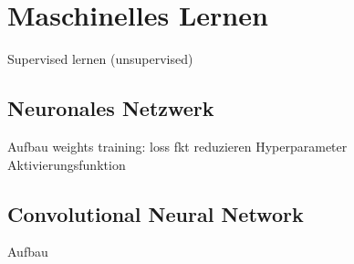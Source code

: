 \section{Maschinelles Lernen}
Supervised lernen (unsupervised)


\subsection{Neuronales Netzwerk}

Aufbau
    weights 
training: loss fkt reduzieren
Hyperparameter
Aktivierungsfunktion 
\subsection{Convolutional Neural Network}

Aufbau
